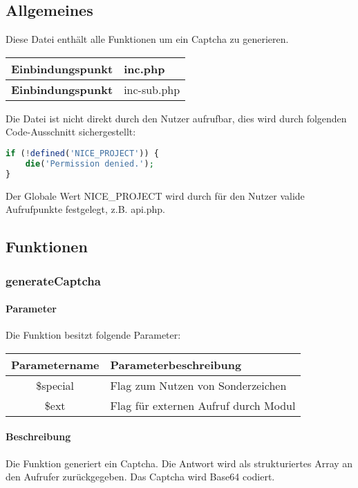 \subsection{Allgemeines} Diese Datei enthält alle Funktionen um ein Captcha zu generieren.
\begin{table}[H]
	\begin{tabular}{|c|p{11cm}|}
		\hline
		\textbf{Einbindungspunkt} & inc.php \\ \hline
		\textbf{Einbindungspunkt} & inc-sub.php \\ \hline
	\end{tabular}
\end{table}
Die Datei ist nicht direkt durch den Nutzer aufrufbar, dies wird durch folgenden Code-Ausschnitt sichergestellt:
\begin{lstlisting}[language=php]
if (!defined('NICE_PROJECT')) {
	die('Permission denied.');
}
\end{lstlisting}
Der Globale Wert {\glqq NICE\_PROJECT\grqq} wird durch für den Nutzer valide Aufrufpunkte festgelegt, z.B. {\glqq api.php\grqq}.
\subsection{Funktionen}
\subsubsection{generateCaptcha}
\paragraph{Parameter} Die Funktion besitzt folgende Parameter:
\begin{table}[H]
	\begin{tabular}{|c|p{11cm}|}
		\hline
		\textbf{Parametername} & \textbf{Parameterbeschreibung} \\ \hline
		\$special & Flag zum Nutzen von Sonderzeichen \\ \hline
		\$ext     & Flag für externen Aufruf durch Modul \\ \hline
	\end{tabular}
\end{table}
\paragraph{Beschreibung} Die Funktion generiert ein Captcha. Die Antwort wird als strukturiertes Array an den Aufrufer zurückgegeben. Das Captcha wird Base64 codiert.
